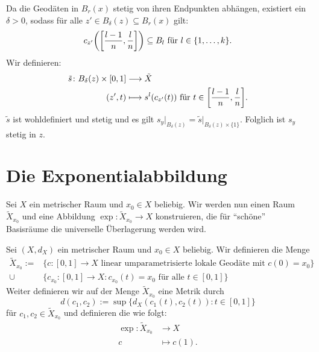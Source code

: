 \begin{beweis}
\begin{itemize}
\begin{figure}[h]
		\end{figure}
		
		Da die Geodäten in $B_r(x)$ stetig von ihren Endpunkten abhängen, existiert ein $\delta > 0$, sodass für alle $z' \in B_\delta(z) \subseteq B_r(x)$ gilt:
		\[
			c_{z'} \enbrace*{\benbrace*{\frac{l-1}{n},\frac{l}{n}}} \subseteq B_l \text{ für } l \in \{1,\dots,k\}.
		\]
		Wir definieren:
		\begin{align*}
			\tilde{s}\colon B_\delta(z) \times [0,1] &\longrightarrow \tilde{X} \\
			(z',t) &\longmapsto s^l(c_{z'}(t)) \text{ für } t \in \benbrace*{\frac{l-1}{n},\frac{l}{n}}.
		\end{align*}
		$\tilde{s}$ ist wohldefiniert und stetig und es gilt $s_y \big|_{B_\delta(z)} = \tilde{s} \big|_{B_\delta(z) \times \{1\}}$.
		Folglich ist $s_y$ stetig in $z$. \qedhere	
	\end{itemize}
\end{beweis}

\section{Die Exponentialabbildung}
\label{sec:2.3}
	Sei $X$ ein metrischer Raum und $x_0 \in X$ beliebig. 
	Wir werden nun einen Raum $\tilde{X}_{x_0}$ und eine Abbildung $\exp\colon \tilde{X}_{x_0} \rightarrow X$ konstruieren, die für \enquote{schöne} Basisräume die universelle Überlagerung werden wird.
\newpage	
\begin{definition}[Exponentialabbildung]
\label{def:2.29}
	Sei $(X,d_X)$ ein metrischer Raum und $x_0 \in X$ beliebig.
	Wir definieren die Menge
	\begin{align*}
		\tilde{X}_{x_0} := &\{c \colon [0,1] \rightarrow X \text{ linear umparametrisierte lokale Geodäte mit } c(0) = x_0\} \\
		\cup &\{c_{x_0} \colon [0,1] \rightarrow X : c_{x_0}(t) = x_0 \text{ für alle } t \in [0,1]\}
	\end{align*}
	Weiter definieren wir auf der Menge $\tilde{X}_{x_0}$ eine Metrik durch
	\[
		d(c_1,c_2) := \sup \{ d_X(c_1(t),c_2(t)) : t \in [0,1]\}
	\]
	für $c_1,c_2 \in \tilde{X}_{x_0}$ und definieren die  wie folgt:
	\begin{align*}
		\exp\colon \tilde{X}_{x_0} &\longrightarrow X \\
		c &\longmapsto c(1).
	\end{align*}
\end{definition}	
	
